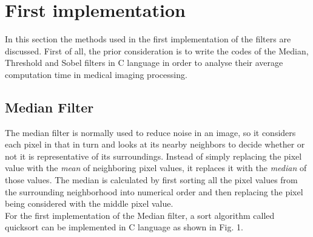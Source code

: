 \documentclass[journal]{IEEEtran}
\begin{document}
%



\section{First implementation}

In this section the methods used in the first implementation of the filters are discussed. First of all, the prior consideration is to write the codes of the Median, Threshold and Sobel filters in C language in order to analyse their average computation time in medical imaging processing.

\subsection{Median Filter}
The median filter is normally used to reduce noise in an image, so it considers each pixel in that in turn and looks at its nearby neighbors to decide whether or not it is representative of its surroundings. Instead of simply replacing the pixel value with the \textit{mean} of neighboring pixel values, it replaces it with the \textit{median} of those values. The median is calculated by first sorting all the pixel values from the surrounding neighborhood into numerical order and then replacing the pixel being considered with the middle pixel value.\\
\indent For the first implementation of the Median filter, a sort algorithm called quicksort can be implemented in C language as shown in Fig. 1.
\end{document}
